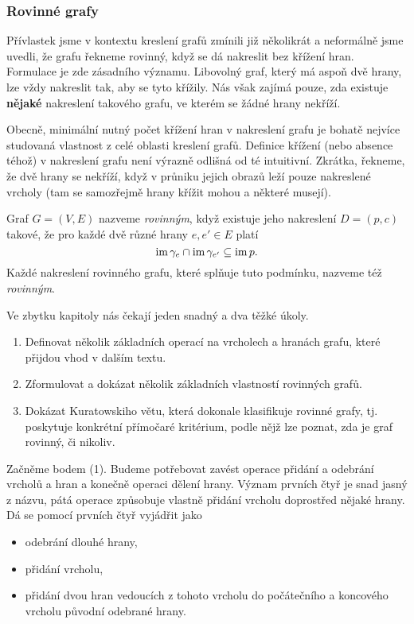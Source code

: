 \subsubsection{Rovinné grafy}
\label{sssec:rovinne-grafy}

Přívlastek  jsme v kontextu kreslení grafů zmínili již několikrát a
neformálně jsme uvedli, že grafu řekneme rovinný, když se dá nakreslit bez
křížení hran. Formulace  je zde zásadního významu. Libovolný
graf, který má aspoň dvě hrany, lze vždy nakreslit tak, aby se tyto křížily. Nás
však zajímá pouze, zda existuje \textbf{nějaké} nakreslení takového grafu, ve
kterém se žádné hrany nekříží.

Obecně, minimální nutný počet křížení hran v nakreslení grafu je bohatě nejvíce
studovaná vlastnost z celé oblasti kreslení grafů. Definice křížení (nebo
absence téhož) v nakreslení grafu není výrazně odlišná od té intuitivní.
Zkrátka, řekneme, že dvě hrany se nekříží, když v průniku jejich obrazů leží
pouze nakreslené vrcholy (tam se samozřejmě hrany křížit mohou a některé
musejí).

\begin{definition}
 \label{def:rovinny-graf}
 Graf $G = (V,E)$ nazveme \emph{rovinným}, když existuje jeho nakreslení $D =
 (p,c)$ takové, že pro každé dvě různé hrany $e,e' \in E$ platí
 \[
  \operatorname{im} \gamma_e \cap \operatorname{im} \gamma_{e'} \subseteq \operatorname{im} p.
 \]
 Každé nakreslení rovinného grafu, které splňuje tuto podmínku, nazveme též
 \emph{rovinným}.
\end{definition}

Ve zbytku kapitoly nás čekají jeden snadný a dva těžké úkoly.
\begin{enumerate}
 \item Definovat několik základních operací na vrcholech a hranách grafu, které
  přijdou vhod v dalším textu.
 \item Zformulovat a dokázat několik základních vlastností rovinných gra\-fů.
 \item Dokázat Kuratowskiho větu, která dokonale klasifikuje rovinné gra\-fy,
  tj. poskytuje konkrétní přímočaré kritérium, podle nějž lze poznat, zda je
  graf rovinný, či nikoliv.
\end{enumerate}

Začněme bodem (1). Budeme potřebovat zavést operace přidání a odebrání vrcholů a
hran a konečně operaci dělení hrany. Význam prvních čtyř je snad jasný z názvu,
pátá operace způsobuje vlastně přidání vrcholu doprostřed nějaké hrany. Dá se
pomocí prvních čtyř vyjádřit jako
\begin{itemize}
 \item odebrání dlouhé hrany,
 \item přidání vrcholu,
 \item přidání dvou hran vedoucích z tohoto vrcholu do počátečního a koncového
  vrcholu původní odebrané hrany.
\end{itemize}


